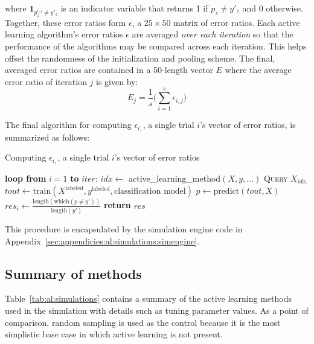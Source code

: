 \noindent where $\textbf{1}_{p^{i,j}_z \neq y'_z}$ is an indicator variable 
that returns 1 if $p_z \neq y'_z$ and 0 otherwise. Together, these error ratios 
form $\epsilon$, a $25\times 50$ matrix of error ratios. Each active learning
algorithm's error ratios $\epsilon$ are averaged \textit{over each iteration} 
so that the performance of the algorithms may be compared across each 
iteration. This helps offset the randomness of the initialization and pooling 
scheme. The final, averaged error ratios are contained in a 50-length vector 
$E$ where the average error ratio of iteration $j$ is given by:
$$E_{j} = \frac{1}{s} \bigg( \sum\limits_{i=1}^{s} \epsilon_{i,j} \bigg)$$

The final algorithm for computing $\epsilon_{i,}$, a single trial $i$'s vector 
of error ratios, is summarized as follows:

\tablespacing
\begin{algorithm}[H]
	\caption{Computing $\epsilon_{i,}$, a single trial $i$'s vector of error 
	ratios}\label{alg:al:simulation:evaluation}
	\begin{algorithmic}[1]
		\State \textbf{loop from} $i=1$ \textbf{to} $iter$:
		\State \indent $idx \gets $ active\_learning\_method$(X,y,...)$
		\State \indent \textsc{Query} $X_{idx,}$
		\State \indent $tout \gets 
		\text{train}(X^{\text{labeled}},y^{\text{labeled}},\text{classification 
		model})$
		\State \indent $p \gets \text{predict}(tout,X)$
		\State \indent $res_i\gets \frac{\text{length}(\text{which}(p \neq y'))}
		{\text{length}(y')}$
		\State \textbf{return} $res$
		\EndProcedure
	\end{algorithmic}
\end{algorithm}
\bodyspacing

\noindent This procedure is encapsulated by 
the simulation engine code in 
Appendix~\ref{sec:appendicies:al:simulations:simengine}.

\subsection{Summary of methods}
\label{sec:al:simulation:methods}

Table~\ref{tab:al:simulations} contains a summary of the active learning 
methods used in the simulation with details such as tuning parameter values. 
As a point of comparison, random sampling is used as the control because it is 
the most simplistic base case in which active learning is not present.

